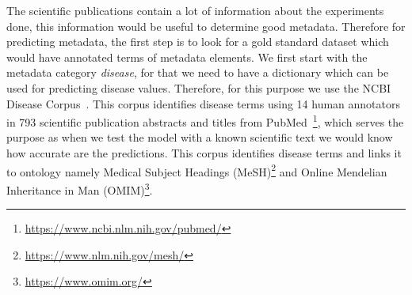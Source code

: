 The scientific publications contain a lot of information about the experiments done, this information would be useful to determine good metadata. Therefore for predicting metadata, the first step is to look for a gold standard dataset which would have annotated terms of metadata elements. We first start with the metadata category \emph{disease}, for that we need to have a dictionary which can be used for predicting disease values. Therefore, for this purpose we use the NCBI Disease Corpus~\cite{dougan2014ncbi}. This corpus identifies disease terms using 14 human annotators in 793 scientific publication abstracts and titles from PubMed~\footnote{\url{https://www.ncbi.nlm.nih.gov/pubmed/}}, which serves the purpose as when we test the model with a known scientific text we would know how accurate are the predictions. This corpus identifies disease terms and links it to ontology namely Medical Subject Headings (MeSH)\footnote{\url{https://www.nlm.nih.gov/mesh/}} and Online Mendelian Inheritance in Man (OMIM)\footnote{\url{https://www.omim.org/}}. 

